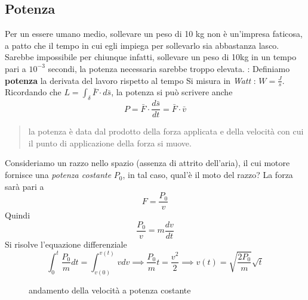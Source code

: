 \documentclass[10pt, letterpaper]{report}
\begin{document}
\subsection{Potenza}
Per un essere umano medio, sollevare un peso di 10 kg non è un'impresa faticosa, a patto che il tempo in cui egli
impiega per sollevarlo sia abbastanza lasco. Sarebbe impossibile per chiunque infatti, sollevare un peso di 10kg in 
un tempo pari a $10^{-3}$ secondi, la potenza necessaria sarebbe troppo elevata.\acc 
{} : Definiamo \textbf{potenza} la derivata del lavoro rispetto al tempo 
Si misura in \textit{Watt} : $W=\frac{J}{s}$.
Ricordando che $L=\int_\delta \bar F\cdot d\bar s$, la potenza si può scrivere anche 
$$ P=\bar F\cdot \frac{d\bar s}{dt}=\bar F\cdot \bar v$$
\begin{quote}
    la potenza è data dal prodotto della forza applicata e della velocità con cui il punto di applicazione della forza si muove.
\end{quote}
Consideriamo un razzo nello spazio (assenza di attrito dell'aria), il cui motore fornisce una 
\textit{potenza costante} $P_0$, in tal caso, qual'è il moto del razzo? La forza sarà pari a 
$$ F=\frac{P_0}{v}$$
Quindi 
$$ \frac{P_0}{v}=m\frac{dv}{dt}$$
Si risolve l'equazione differenziale 
$$ \int_0^t\frac{P_0}{m}dt=\int_{v(0)}^{v(t)}vdv\implies \frac{P_0}{m}t=\frac{v^2}{2}\implies v(t) = \sqrt{\frac{2P_0}{m}}\sqrt{t}$$
\begin{figure}[h!]\centering
    \caption{andamento della velocità a potenza costante}
\end{figure}
\end{document}
